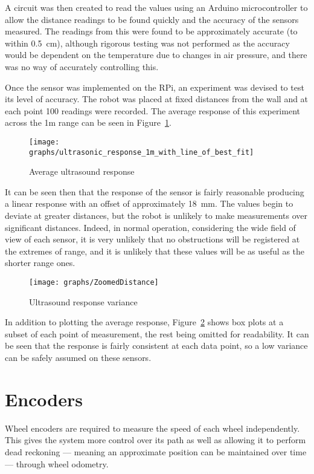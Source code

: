 A circuit was then created to read the values using an Arduino
microcontroller to allow the distance readings to be found quickly
and the accuracy of the sensors measured. The readings from this were
found to be approximately accurate (to within \SI{0.5}{\cm}),
although rigorous testing was not
performed as the accuracy would be dependent on the temperature due
to changes in air pressure, and there was no way of accurately controlling this.

Once the sensor was implemented on the RPi, an experiment was devised to test
its level of accuracy. The robot was placed at fixed distances from the wall
and at each point 100 readings were recorded. The average response of this
experiment across the 1m range can be seen in Figure~\ref{fig:usline}.

\begin{figure}[!ht]
	\centering
	\texttt{[image: graphs/ultrasonic\_response\_1m\_with\_line\_of\_best\_fit]}
	\caption{Average ultrasound response}\label{fig:usline}
\end{figure}

It can be seen then that the response of the sensor is fairly reasonable producing a linear response with an offset of approximately \SI{18}{\milli\meter}. The values begin to deviate at greater distances, but the robot is unlikely to make measurements over significant distances. Indeed, in normal operation, considering the wide field of view of each sensor, it is very unlikely that no obstructions will be registered at the extremes of range, and it is unlikely that these values will be as useful as the shorter range ones.

\begin{figure}[!ht]
	\centering
	\texttt{[image: graphs/ZoomedDistance]}
	\caption{Ultrasound response variance}\label{fig:usboxplots}
\end{figure}

In addition to plotting the average response, Figure~\ref{fig:usboxplots}
shows box plots at a subset of each point of measurement, the rest being
omitted for readability. It can be seen that the response is fairly
consistent at each data point, so a low variance can be safely assumed on
these sensors.

\section{Encoders}\label{elec/encoder}
Wheel encoders are required to measure the speed of each wheel
independently. This gives the system more control over its path
as well as allowing it to perform dead reckoning --- meaning an
approximate position can be maintained over time --- through wheel odometry.

